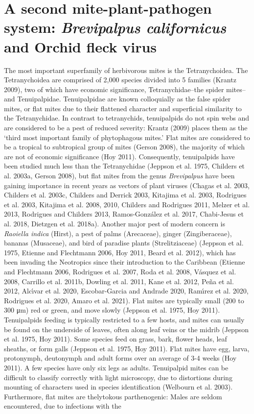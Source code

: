 \documentclass[12pt,final,CPage]{ufthesis}
\begin{document}
{  \hypertarget{bcali-litrev}{%
  \section{\texorpdfstring{A second mite-plant-pathogen system: \emph{Brevipalpus californicus} and Orchid fleck virus}{A second mite-plant-pathogen system: Brevipalpus californicus and Orchid fleck virus}}\label{bcali-litrev}}

  The most important superfamily of herbivorous mites is the Tetranychoidea. The Tetranychoidea are comprised of 2,000 species divided into 5 families (Krantz 2009), two of which have economic significance, Tetranychidae--the spider mites--and Tenuipalpidae. Tenuipalpidae are known colloquially as the false spider mites, or flat mites due to their flattened character and superficial similarity to the Tetranychidae. In contrast to tetranychids, tenuipalpids do not spin webs and are considered to be a pest of reduced severity: Krantz (2009) places them as the `third most important family of phytophagous mites.' Flat mites are considered to be a tropical to subtropical group of mites (Gerson 2008), the majority of which are not of economic significance (Hoy 2011). Consequently, tenuipalpids have been studied much less than the Tetranychidae (Jeppson et al. 1975, Childers et al. 2003a, Gerson 2008), but flat mites from the genus \emph{Brevipalpus} have been gaining importance in recent years as vectors of plant viruses (Chagas et al. 2003, Childers et al. 2003c, Childers and Derrick 2003, Kitajima et al. 2003, Rodrigues et al. 2003, Kitajima et al. 2008, 2010, Childers and Rodrigues 2011, Melzer et al. 2013, Rodrigues and Childers 2013, Ramos-González et al. 2017, Chabi-Jesus et al. 2018, Dietzgen et al. 2018a). Another major pest of modern concern is \emph{Raoiella indica} (Hirst), a pest of palms (Arecaceae), ginger (Zingiberaceae), bananas (Musaceae), and bird of paradise plants (Strelitziaceae) (Jeppson et al. 1975, Etienne and Flechtmann 2006, Hoy 2011, Beard et al. 2012), which has been invading the Neotropics since their introduction to the Caribbean (Etienne and Flechtmann 2006, Rodrigues et al. 2007, Roda et al. 2008, Vásquez et al. 2008, Carrillo et al. 2011b, Dowling et al. 2011, Kane et al. 2012, Peña et al. 2012, Alcı́var et al. 2020, Escobar-Garcia and Andrade 2020, Ramı́rez et al. 2020, Rodrigues et al. 2020, Amaro et al. 2021). Flat mites are typically small (200 to 300 \si{\micro\metre}) red or green, and move slowly (Jeppson et al. 1975, Hoy 2011). Tenuipalpids feeding is typically restricted to a few hosts, and mites can usually be found on the underside of leaves, often along leaf veins or the midrib (Jeppson et al. 1975, Hoy 2011). Some species feed on grass, bark, flower heads, leaf sheaths, or form galls (Jeppson et al. 1975, Hoy 2011). Flat mites have egg, larva, protonymph, deutonymph and adult forms over an average of 3-4 weeks (Hoy 2011). A few species have only six legs as adults. Tenuipalpid mites can be difficult to classify correctly with light microscopy, due to distortions during mounting of characters used in species identification (Welbourn et al. 2003). Furthermore, flat mites are thelytokous parthenogenic: Males are seldom encountered, due to infections with the }
\end{document}
